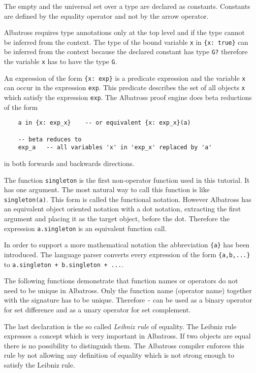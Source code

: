 The empty and the universal set over a type are declared as
constants. Constants are defined by the equality operator and not by the arrow
operator.

Albatross requires type annotations only at the top level and if the type
cannot be inferred from the context. The type of the bound variable
\lstinline!x! in \lstinline!{x: true}! can be inferred from the context
because the declared constant has type \lstinline!G?! therefore the variable
\lstinline!x! has to have the type \lstinline!G!.

An expression of the form \lstinline!{x: exp}! is a predicate expression and
the variable \lstinline!x! can occur in the expression \lstinline!exp!. This
predicate describes the set of all objects \lstinline!x! which satisfy the
expression \lstinline!exp!. The Albatross proof engine does beta reductions of
the form
\begin{lstlisting}
    a in {x: exp_x}    -- or equivalent {x: exp_x}(a)

    -- beta reduces to
    exp_a   -- all variables 'x' in 'exp_x' replaced by 'a'
\end{lstlisting}
in both forwards and backwards directions.

The function \lstinline!singleton! is the first non-operator function used in
this tutorial. It has one argument. The most natural way to call this function
is like \lstinline!singleton(a)!. This form is called the functional
notation. However Albatross has an equivalent object oriented notation with a
dot notation, extracting the first argument and placing it as the target object,
before the dot. Therefore the expression \lstinline!a.singleton! is an
equivalent function call.

In order to support a more mathematical notation the abbreviation
\lstinline!{a}! has been introduced. The language parser converts every
expression of the form \lstinline!{a,b,...}! to
\lstinline!a.singleton + b.singleton + ...!.

The following functions demonstrate that function names or operators do not
need to be unique in Albatross. Only the function name (operator name)
together with the signature has to be unique. Therefore \lstinline!-! can be
used as a binary operator for set difference and as a unary operator for set
complement.

The last declaration is the so called {\em Leibniz rule} of equality.  The
Leibniz rule expresses a concept which is very important in Albatross. If two
objects are equal there is no possibility to distinguish them. The Albatross
compiler enforces this rule by not allowing any definition of equality which
is not strong enough to satisfy the Leibniz rule.

